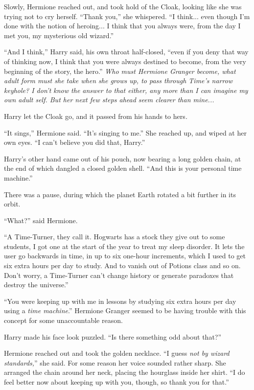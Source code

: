 Slowly, Hermione reached out, and took hold of the Cloak, looking like she was trying not to cry herself. ``Thank you,'' she whispered. ``I think... even though I'm done with the notion of heroing... I think that you always were, from the day I met you, my mysterious old wizard.''

``And I think,'' Harry said, his own throat half-closed, ``even if you deny that way of thinking now, I think that you were always destined to become, from the very beginning of the story, the hero.'' \emph{Who must Hermione Granger become, what adult form must she take when she grows up, to pass through Time's narrow keyhole? I don't know the answer to that either, any more than I can imagine my own adult self. But her next few steps ahead seem clearer than mine...}

Harry let the Cloak go, and it passed from his hands to hers\emph{.}

``It sings,'' Hermione said. ``It's singing to me.'' She reached up, and wiped at her own eyes. ``I can't believe you did that, Harry.''

Harry's other hand came out of his pouch, now bearing a long golden chain, at the end of which dangled a closed golden shell. ``And this is your personal time machine.''

There was a pause, during which the planet Earth rotated a bit further in its orbit.

``What?'' said Hermione.

``A Time-Turner, they call it. Hogwarts has a stock they give out to some students, I got one at the start of the year to treat my sleep disorder. It lets the user go backwards in time, in up to six one-hour increments, which I used to get six extra hours per day to study. And to vanish out of Potions class and so on. Don't worry, a Time-Turner can't change history or generate paradoxes that destroy the universe.''

``You were keeping up with me in lessons by studying six extra hours per day using a \emph{time machine}.'' Hermione Granger seemed to be having trouble with this concept for some unaccountable reason.

Harry made his face look puzzled. ``Is there something odd about that?''

Hermione reached out and took the golden necklace. ``I guess \emph{not by wizard standards,}'' she said. For some reason her voice sounded rather sharp. She arranged the chain around her neck, placing the hourglass inside her shirt. ``I do feel better now about keeping up with you, though, so thank you for that.''

